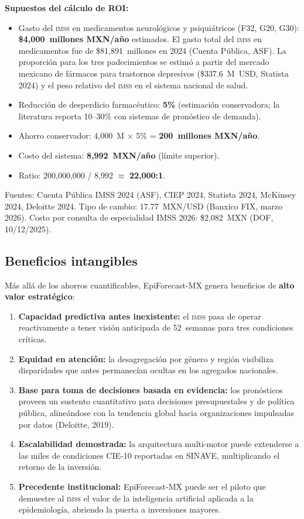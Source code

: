 \documentclass[12pt, letterpaper]{article}
\newenvironment{insightbox}[1][]{\par\medskip\begin{lrbox}{\boxcontents}\begin{minipage}{\dimexpr\textwidth-12pt}\setlength{\emergencystretch}{5em}\setlength{\parskip}{6pt}}{\end{minipage}\end{lrbox}\noindent\colorbox{lightgreen}{\usebox{\boxcontents}}\par\medskip}
\newcommand{\imss}{\textnormal{\textsc{imss}}}
\begin{document}
\begin{insightbox}
\textbf{Supuestos del cálculo de ROI:}
\begin{itemize}
  \item Gasto del \imss{} en medicamentos neurológicos y psiquiátricos (F32, G20, G30): \textbf{\$4,000~millones MXN/año} estimados. El gasto total del \imss{} en medicamentos fue de \$81,891~millones en 2024 (Cuenta Pública, ASF). La proporción para los tres padecimientos se estimó a partir del mercado mexicano de fármacos para trastornos depresivos (\$337.6~M~USD, Statista 2024) y el peso relativo del \imss{} en el sistema nacional de salud.
  \item Reducción de desperdicio farmacéutico: \textbf{5\%} (estimación conservadora; la literatura reporta 10--30\% con sistemas de pronóstico de demanda).
  \item Ahorro conservador: 4,000~M $\times$ 5\% = \textbf{200~millones MXN/año}.
  \item Costo del sistema: \textbf{8,992~MXN/año} (límite superior).
  \item Ratio: 200,000,000 / 8,992 $\approx$ \textbf{22,000:1}.
\end{itemize}
\scriptsize Fuentes: Cuenta Pública IMSS 2024 (ASF), CIEP 2024, Statista 2024, McKinsey 2024, Deloitte 2024. Tipo de cambio: 17.77~MXN/USD (Banxico FIX, marzo 2026). Costo por consulta de especialidad IMSS 2026: \$2,082~MXN (DOF, 10/12/2025).
\end{insightbox}

\newpage

\subsection{Beneficios intangibles}

Más allá de los ahorros cuantificables, EpiForecast-MX genera beneficios de \textbf{alto valor estratégico}:

\begin{enumerate}
  \item \textbf{Capacidad predictiva antes inexistente:} el \imss{} pasa de operar reactivamente a tener visión anticipada de 52~semanas para tres condiciones críticas.
  \item \textbf{Equidad en atención:} la desagregación por género y región visibiliza disparidades que antes permanecían ocultas en los agregados nacionales.
  \item \textbf{Base para toma de decisiones basada en evidencia:} los pronósticos proveen un sustento cuantitativo para decisiones presupuestales y de política pública, alineándose con la tendencia global hacia organizaciones impulsadas por datos (Deloitte, 2019).
  \item \textbf{Escalabilidad demostrada:} la arquitectura multi-motor puede extenderse a las miles de condiciones CIE-10 reportadas en SINAVE, multiplicando el retorno de la inversión.
  \item \textbf{Precedente institucional:} EpiForecast-MX puede ser el piloto que demuestre al \imss{} el valor de la inteligencia artificial aplicada a la epidemiología, abriendo la puerta a inversiones mayores.
\end{enumerate}
\end{document}
